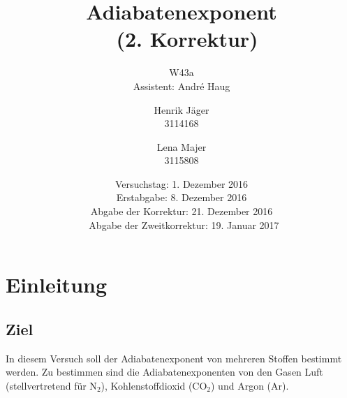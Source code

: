 \documentclass[12pt,a4paper,]{scrreprt}
\begin{document}
\title{Adiabatenexponent \\ (2. Korrektur)}
\author{Henrik Jäger \\ 3114168 \and Lena Majer \\ 3115808}
\subtitle{W43a \\  Assistent: André Haug}
\subject{Physikalisches Praktikum I}
\publishers{Universität Stuttgart}
\date{Versuchstag: 1. Dezember 2016 \\ Erstabgabe: 8. Dezember 2016 \\ Abgabe der Korrektur: 21. Dezember 2016 \\ Abgabe der Zweitkorrektur: 19. Januar 2017}

\maketitle%

\tableofcontents   %
\pagebreak

\captionsetup{width=0.8\linewidth}

\chapter{Einleitung}
\section{Ziel}
In diesem Versuch soll der Adiabatenexponent von mehreren Stoffen bestimmt werden. Zu bestimmen sind die Adiabatenexponenten von den Gasen Luft (stellvertretend für N$_2$), Kohlenstoffdioxid (CO$_2$) und Argon (Ar).
\end{document}
